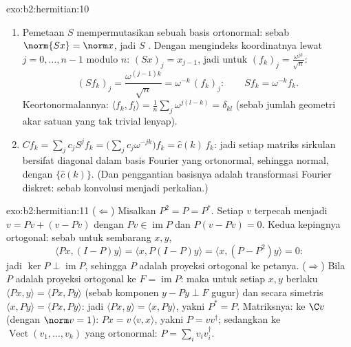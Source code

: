 \begin{solution}{exo:b2:hermitian:10}
\begin{enumerate}
  \item Pemetaan $S$ mempermutasikan sebuah basis ortonormal: sebab $\norm{Sx} = \norm
        x$, jadi $S$ . Dengan mengindeks koordinatnya lewat $j = 0,
        \dots, n-1$ modulo $n$: $(Sx)_j = x_{j-1}$, jadi untuk
        $(f_k)_j = \frac{\omega^{jk}}{\sqrt n}$:
        \[
        (Sf_k)_j = \frac{\omega^{(j-1)k}}{\sqrt n}
        = \omega^{-k}\,(f_k)_j :
        \qquad Sf_k = \omega^{-k}f_k .
        \]
        Keortonormalannya: $\langle f_k, f_l\rangle = \frac1n
        \sum_j \omega^{j(l-k)} = \delta_{kl}$ (sebab jumlah geometri
        akar satuan yang tak trivial lenyap).
  \item $Cf_k = \sum_j c_j S^jf_k = \bigl(\sum_j
        c_j\omega^{-jk}\bigr)f_k = \widehat c(k)\,f_k$: jadi setiap
        matriks sirkulan bersifat diagonal dalam basis Fourier yang ortonormal,
        sehingga normal, dengan  $\{\widehat c(k)\}$. (Dan
        penggantian basisnya adalah transformasi Fourier diskret:
        sebab konvolusi menjadi perkalian.)
\end{enumerate}
\end{solution}

\begin{solution}{exo:b2:hermitian:11}
($\Leftarrow$) Misalkan $P^2 = P = P^*$. Setiap $v$ terpecah menjadi $v = Pv
+ (v - Pv)$ dengan $Pv \in \operatorname{im} P$ dan $P(v - Pv) =
0$. Kedua kepingnya ortogonal: sebab untuk sembarang $x, y$,
\[
\langle Px, (I - P)y\rangle = \langle x, P(I-P)y\rangle
= \langle x, (P - P^2)y\rangle = 0 :
\]
jadi $\ker P \perp \operatorname{im} P$, sehingga $P$ adalah proyeksi
ortogonal ke petanya. ($\Rightarrow$) Bila $P$ adalah proyeksi
ortogonal ke $F = \operatorname{im}P$: maka untuk setiap
$x, y$ berlaku $\langle Px, y\rangle = \langle Px, Py\rangle$ (sebab
komponen $y - Py \perp F$ gugur) dan secara simetris $\langle
x, Py\rangle = \langle Px, Py\rangle$: jadi $\langle Px, y\rangle =
\langle x, Py\rangle$, yakni $P^* = P$. Matriksnya: ke $\C v$
(dengan $\norm v = 1$): $Px = v\,\langle v, x\rangle$, yakni $P =
vv^\dagger$; sedangkan ke $\operatorname{Vect}(v_1, \dots, v_k)$
yang ortonormal: $P = \sum_i v_iv_i^\dagger$.
\end{solution}

